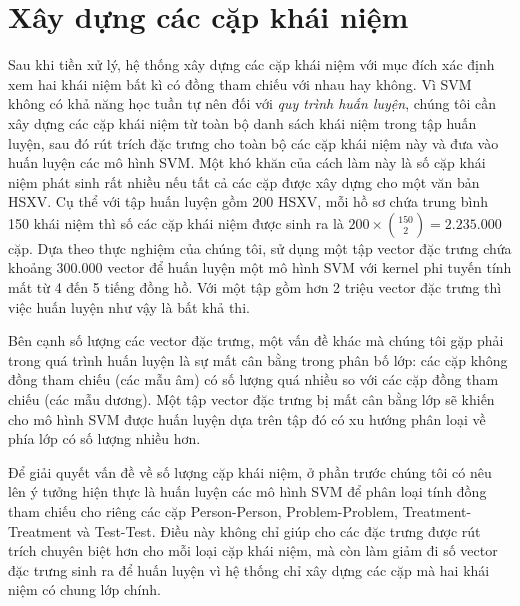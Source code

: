 \section{Xây dựng các cặp khái niệm}
Sau khi tiền xử lý, hệ thống xây dựng các cặp khái niệm với mục đích xác định xem hai khái niệm bất kì có đồng tham chiếu với nhau hay không. Vì SVM không có khả năng học tuần tự nên đối với \emph{quy trình huấn luyện}, chúng tôi cần xây dựng các cặp khái niệm từ toàn bộ danh sách khái niệm trong tập huấn luyện, sau đó rút trích đặc trưng cho toàn bộ các cặp khái niệm này và đưa vào huấn luyện các mô hình SVM. Một khó khăn của cách làm này là số cặp khái niệm phát sinh rất nhiều nếu tất cả các cặp được xây dựng cho một văn bản HSXV. Cụ thể với tập huấn luyện gồm 200 HSXV, mỗi hồ sơ chứa trung bình 150 khái niệm thì số các cặp khái niệm được sinh ra là $200\times \binom{150}{2}=2.235.000$ cặp. Dựa theo thực nghiệm của chúng tôi, sử dụng một tập vector đặc trưng chứa khoảng 300.000 vector để huấn luyện một mô hình SVM với kernel phi tuyến tính mất từ 4 đến 5 tiếng đồng hồ. Với một tập gồm hơn 2 triệu vector đặc trưng thì việc huấn luyện như vậy là bất khả thi.

Bên cạnh số lượng các vector đặc trưng, một vấn đề khác mà chúng tôi gặp phải trong quá trình huấn luyện là sự mất cân bằng trong phân bố lớp: các cặp không đồng tham chiếu (các mẫu âm) có số lượng quá nhiều so với các cặp đồng tham chiếu (các mẫu dương). Một tập vector đặc trưng bị mất cân bằng lớp sẽ khiến cho mô hình SVM được huấn luyện dựa trên tập đó có xu hướng phân loại về phía lớp có số lượng nhiều hơn. 

Để giải quyết vấn đề về số lượng cặp khái niệm, ở phần trước chúng tôi có nêu lên ý tưởng hiện thực là huấn luyện các mô hình SVM để phân loại tính đồng tham chiếu cho riêng các cặp Person-Person, Problem-Problem, Treatment-Treatment và Test-Test. Điều này không chỉ giúp cho các đặc trưng được rút trích chuyên biệt hơn cho mỗi loại cặp khái niệm, mà còn làm giảm đi số vector đặc trưng sinh ra để huấn luyện vì hệ thống chỉ xây dựng các cặp mà hai khái niệm có chung lớp chính.

